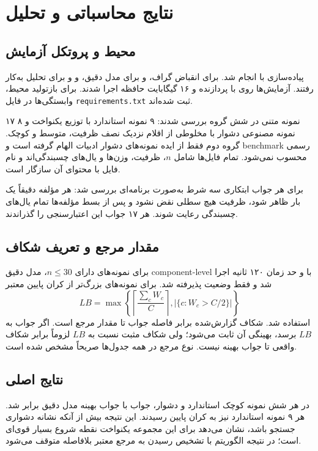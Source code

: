 \section{نتایج محاسباتی و تحلیل}

\subsection{محیط و پروتکل آزمایش}
پیاده‌سازی با  انجام شد.  برای انقباض گراف،
 و  برای مدل دقیق، و  و  برای تحلیل
به‌کار رفتند. آزمایش‌ها روی  با پردازنده  و
۱۶ گیگابایت حافظه اجرا شدند. برای بازتولید محیط، وابستگی‌ها در فایل
\texttt{requirements.txt} ثبت شده‌اند.

۱۷ نمونه متنی در شش گروه بررسی شدند: ۹ نمونه استاندارد با توزیع یکنواخت و ۸
نمونه مصنوعی دشوار با مخلوطی از اقلام نزدیک نصف ظرفیت، متوسط و کوچک. گروه دوم
فقط از ایده نمونه‌های دشوار ادبیات الهام گرفته است و benchmark رسمی
 محسوب نمی‌شود. تمام فایل‌ها شامل $n$، ظرفیت، وزن‌ها و یال‌های
چسبندگی‌اند و نام فایل با محتوای آن سازگار است.

برای هر جواب ابتکاری سه شرط به‌صورت برنامه‌ای بررسی شد: هر مؤلفه دقیقاً یک بار
ظاهر شود، ظرفیت هیچ سطلی نقض نشود و پس از بسط مؤلفه‌ها تمام یال‌های چسبندگی
رعایت شوند. هر ۱۷ جواب این اعتبارسنجی را گذراندند.

\subsection{مقدار مرجع و تعریف شکاف}
برای نمونه‌های دارای $n\le30$، مدل دقیق component-level با  و حد زمان
۱۲۰ ثانیه اجرا شد و فقط وضعیت  پذیرفته شد. برای نمونه‌های بزرگ‌تر
از کران پایین معتبر
\begin{equation}
LB=\max\left\{\left\lceil\frac{\sum_c W_c}{C}\right\rceil,
\left|\{c:W_c>C/2\}\right|\right\}
\end{equation}
استفاده شد. شکاف گزارش‌شده برابر فاصله جواب تا مقدار مرجع است. اگر جواب به
$LB$ برسد، بهینگی آن ثابت می‌شود؛ ولی شکاف مثبت نسبت به $LB$ لزوماً برابر
شکاف واقعی تا جواب بهینه نیست. نوع مرجع در همه جدول‌ها صریحاً مشخص شده است.

\subsection{نتایج اصلی}



در هر شش نمونه کوچک استاندارد و دشوار، جواب  با جواب بهینه مدل
دقیق برابر شد. هر ۹ نمونه استاندارد نیز به کران پایین رسیدند. این نتیجه بیش از
آنکه نشانه دشواری جستجو باشد، نشان می‌دهد  برای این مجموعه یکنواخت
نقطه شروع بسیار قوی‌ای است؛ در نتیجه الگوریتم با تشخیص رسیدن به مرجع معتبر
بلافاصله متوقف می‌شود.

